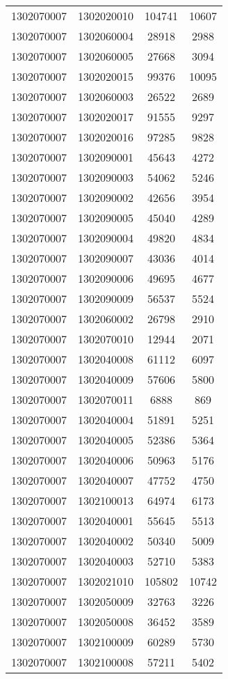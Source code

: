 \begin{longtable}{llcc}
1302070007 & 1302020010 & 104741 & 10607\\
1302070007 & 1302060004 & 28918 & 2988\\
1302070007 & 1302060005 & 27668 & 3094\\
1302070007 & 1302020015 & 99376 & 10095\\
1302070007 & 1302060003 & 26522 & 2689\\
1302070007 & 1302020017 & 91555 & 9297\\
1302070007 & 1302020016 & 97285 & 9828\\
1302070007 & 1302090001 & 45643 & 4272\\
1302070007 & 1302090003 & 54062 & 5246\\
1302070007 & 1302090002 & 42656 & 3954\\
1302070007 & 1302090005 & 45040 & 4289\\
1302070007 & 1302090004 & 49820 & 4834\\
1302070007 & 1302090007 & 43036 & 4014\\
1302070007 & 1302090006 & 49695 & 4677\\
1302070007 & 1302090009 & 56537 & 5524\\
1302070007 & 1302060002 & 26798 & 2910\\
1302070007 & 1302070010 & 12944 & 2071\\
1302070007 & 1302040008 & 61112 & 6097\\
1302070007 & 1302040009 & 57606 & 5800\\
1302070007 & 1302070011 & 6888 & 869\\
1302070007 & 1302040004 & 51891 & 5251\\
1302070007 & 1302040005 & 52386 & 5364\\
1302070007 & 1302040006 & 50963 & 5176\\
1302070007 & 1302040007 & 47752 & 4750\\
1302070007 & 1302100013 & 64974 & 6173\\
1302070007 & 1302040001 & 55645 & 5513\\
1302070007 & 1302040002 & 50340 & 5009\\
1302070007 & 1302040003 & 52710 & 5383\\
1302070007 & 1302021010 & 105802 & 10742\\
1302070007 & 1302050009 & 32763 & 3226\\
1302070007 & 1302050008 & 36452 & 3589\\
1302070007 & 1302100009 & 60289 & 5730\\
1302070007 & 1302100008 & 57211 & 5402\\

\end{longtable}
